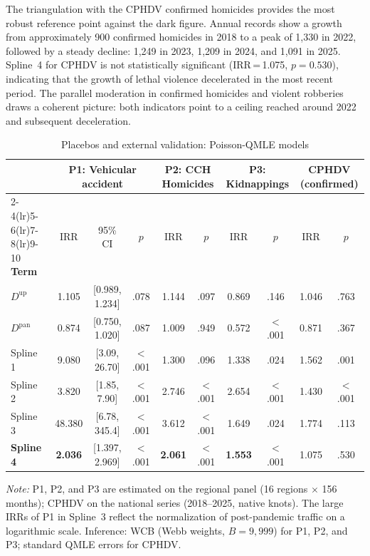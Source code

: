 \documentclass[pdflatex,sn-basic]{sn-jnl}
\newcommand{\tablenote}[1]{%
  \vspace{2pt}\par
  {\footnotesize\textit{Note:} #1\par}
}
\begin{document}
The triangulation with the CPHDV confirmed homicides provides the most robust reference
point against the dark figure. Annual records show a
growth from approximately 900 confirmed homicides in 2018 to a peak
of 1,330 in 2022, followed by a steady decline: 1,249 in 2023, 1,209 in 2024, and
1,091 in 2025. Spline~4 for CPHDV is not statistically significant
(IRR\,=\,1.075, $p=0.530$), indicating that the growth of lethal violence
decelerated in the most recent period. The parallel moderation in confirmed homicides
and violent robberies draws a coherent picture: both indicators point
to a ceiling reached around 2022 and subsequent deceleration.

\begin{table}[htbp]
\centering
\caption{Placebos and external validation: Poisson-QMLE models}
\label{tab:placebos}
\footnotesize
\begin{tabular}{l@{\hskip 3mm}ccc@{\hskip 4mm}cc@{\hskip 4mm}cc@{\hskip 4mm}cc}
\toprule
 & \multicolumn{3}{c}{\textbf{P1: Vehicular accident}} & \multicolumn{2}{c}{\textbf{P2: CCH Homicides}} & \multicolumn{2}{c}{\textbf{P3: Kidnappings}} & \multicolumn{2}{c}{\textbf{CPHDV (confirmed)}} \\
\cmidrule(lr){2-4}\cmidrule(lr){5-6}\cmidrule(lr){7-8}\cmidrule(lr){9-10}
\textbf{Term} & IRR & 95\% CI & $p$ & IRR & $p$ & IRR & $p$ & IRR & $p$ \\
\midrule
$D^{\text{up}}$ & 1.105 & [0.989, 1.234] & .078 & 1.144 & .097 & 0.869 & .146 & 1.046 & .763 \\
$D^{\text{pan}}$ & 0.874 & [0.750, 1.020] & .087 & 1.009 & .949 & 0.572 & $<$.001 & 0.871 & .367 \\
\midrule
Spline 1 &  9.080 & [3.09, 26.70] & $<$.001 & 1.300 & .096 & 1.338 & .024 & 1.562 & .001 \\
Spline 2 &  3.820 & [1.85,  7.90] & $<$.001 & 2.746 & $<$.001 & 2.654 & $<$.001 & 1.430 & $<$.001 \\
Spline 3 & 48.380 & [6.78, 345.4] & $<$.001 & 3.612 & $<$.001 & 1.649 & .024 & 1.774 & .113 \\
\textbf{Spline 4} & \textbf{2.036} & [1.397, 2.969] & $<$.001 & \textbf{2.061} & $<$.001 & \textbf{1.553} & $<$.001 & 1.075 & .530 \\
\bottomrule
\end{tabular}
\tablenote{P1, P2, and P3 are estimated on the regional panel (16 regions $\times$ 156 months);
CPHDV on the national series (2018--2025, native knots). The large IRRs of P1 in
Spline~3 reflect the normalization of post-pandemic traffic on a logarithmic scale.
Inference: WCB (Webb weights, $B=9,999$) for P1, P2, and P3; standard QMLE errors
for CPHDV.}
\end{table}
\end{document}
